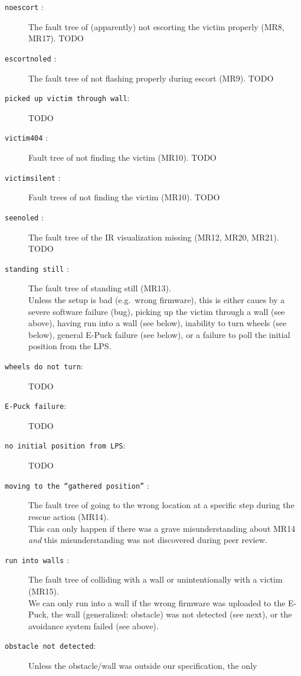 \documentclass[a4paper,parskip,headheight=38pt]{scrartcl} %
\begin{document}
\begin{description}
\item[\texttt{noescort} :]
    The fault tree of (apparently) not escorting the victim properly
    (MR8, MR17). TODO
\item[\texttt{escortnoled} :]
    The fault tree of not flashing properly during escort (MR9). TODO
\item[\texttt{picked up victim through wall}:]
    TODO
\item[\texttt{victim404} :]
    Fault tree of not finding the victim (MR10). TODO
\item[\texttt{victimsilent} :]
    Fault trees of not finding the victim (MR10). TODO
\item[\texttt{seenoled} :]
    The fault tree of the IR visualization missing (MR12, MR20, MR21). TODO
\item[\texttt{standing still} :]
    The fault tree of standing still (MR13).
     \\
    Unless the setup is bad (e.g.\ wrong firmware), this is either
    caues by a severe software failure (bug), picking up the victim
    through a wall (see above), having run into a wall (see below),
    inability to turn wheels (see below), general E-Puck failure (see
    below), or a failure to poll the initial position from the LPS.
\item[\texttt{wheels do not turn}:]
    TODO
\item[\texttt{E-Puck failure}:]
    TODO
\item[\texttt{no initial position from LPS}:]
    TODO
\item[\texttt{moving to the \enquote{gathered position}} :]
    The fault tree of going to the wrong location at a specific step
    during the rescue action (MR14).
     \\
    This can only happen if there was a grave misunderstanding about
    MR14 \emph{and} this misunderstanding was not discovered during
    peer review.
\item[\texttt{run into walls} :]
    The fault tree of colliding with a wall or unintentionally with a
    victim (MR15).
     \\
    We can only run into a wall if the wrong firmware was uploaded to
    the E-Puck, the wall (generalized: obstacle) was not detected (see
    next), or the avoidance system failed (see above).
\item[\texttt{obstacle not detected}:]
    Unless the obstacle/wall was outside our specification, the only

\end{description}
\end{document}
